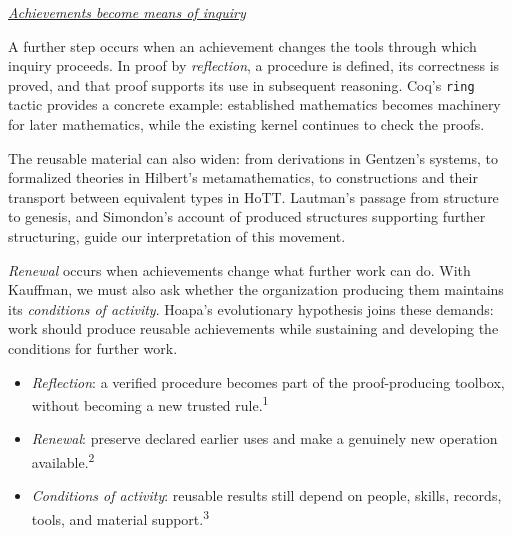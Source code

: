 \documentclass[a4paper,10pt]{article}
\newcommand{\subhead}[1]{\par\addvspace{4pt}\noindent\underline{\emph{#1}}\par\nopagebreak}
\begin{document}
\subhead{Achievements become means of inquiry}
A further step occurs when an achievement changes the tools through which inquiry proceeds. In proof by \textcolor{reflectionviolet}{\emph{reflection}}, a procedure is defined, its correctness is proved, and that proof supports its use in subsequent reasoning. Coq's \texttt{ring} tactic provides a concrete example: established mathematics becomes machinery for later mathematics, while the existing kernel continues to check the proofs.\par
The reusable material can also widen: from derivations in Gentzen's systems, to formalized theories in Hilbert's metamathematics, to constructions and their transport between equivalent types in HoTT. Lautman's passage from structure to genesis, and Simondon's account of produced structures supporting further structuring, guide our interpretation of this movement.\par
\textcolor{emergencecoral}{\emph{Renewal}} occurs when achievements change what further work can do. With Kauffman, we must also ask whether the organization producing them maintains its \textcolor{permaculturegreen}{\emph{conditions of activity}}. Hoapa's evolutionary hypothesis joins these demands: work should produce reusable achievements while sustaining and developing the conditions for further work.\par
\begin{itemize}
\item \textcolor{reflectionviolet}{\emph{Reflection}}: a verified procedure becomes part of the proof-producing toolbox, without becoming a new trusted rule.\textsuperscript{1}
\item \textcolor{emergencecoral}{\emph{Renewal}}: preserve declared earlier uses and make a genuinely new operation available.\textsuperscript{2}
\item \textcolor{permaculturegreen}{\emph{Conditions of activity}}: reusable results still depend on people, skills, records, tools, and material support.\textsuperscript{3}
\end{itemize}
\end{document}

